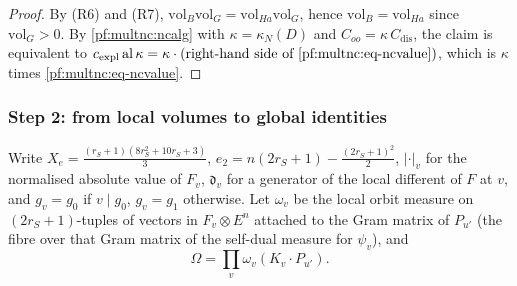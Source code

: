 \begin{proof}
By (R6) and (R7), $\mathrm{vol}_B\mathrm{vol}_G=\mathrm{vol}_{Ha}\mathrm{vol}_G$, hence $\mathrm{vol}_B=\mathrm{vol}_{Ha}$
since $\mathrm{vol}_G>0$. By \cref{pf:multnc:ncalg} with $\kappa=\kappa_N(D)$ and $C_{oo}=\kappa\,C_{\mathrm{dis}}$, the claim
is equivalent to $c_{\mathrm{expl}}\,\mathrm{al}\,\kappa=\kappa\cdot(\text{right-hand side of \eqref{pf:multnc:eq-ncvalue}})$,
which is $\kappa$ times \eqref{pf:multnc:eq-ncvalue}.
\end{proof}


\subsubsection*{Step 2: from local volumes to global identities}

Write $X_e=\frac{(r_S+1)(8r_S^2+10r_S+3)}{3}$, $e_2=n(2r_S+1)-\frac{(2r_S+1)^2}2$, $|\cdot|_v$ for the normalised absolute
value of $F_v$, $\mathfrak d_v$ for a generator of the local different of $F$ at $v$, and $g_v=g_0$ if $v\mid g_0$,
$g_v=g_1$ otherwise. Let $\omega_v$ be the local orbit measure on $(2r_S+1)$-tuples of vectors in $F_v\otimes E^n$ attached
to the Gram matrix of $P_{u'}$ (the fibre over that Gram matrix of the self-dual measure for $\psi_v$), and
\[
\Omega=\prod_v\omega_v(K_v\cdot P_{u'}).
\]

